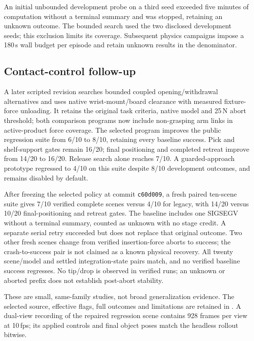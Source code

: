 An initial unbounded development probe on a third seed exceeded five minutes
of computation without a terminal summary and was stopped, retaining an
unknown outcome. The bounded search used the two disclosed development seeds;
this exclusion limits its coverage. Subsequent physics campaigns impose a
180\,s wall budget per episode and retain unknown results in the denominator.

\subsection{Contact-control follow-up}
A later scripted revision searches bounded coupled opening/withdrawal alternatives
and uses native wrist-mount/board clearance with measured fixture-force unloading.
It retains the original task criteria, native model and 25\,N abort threshold;
both comparison programs now include non-grasping arm links in active-product
force coverage. The selected program improves the public regression suite from
6/10 to 8/10, retaining every baseline success. Pick and shelf-support gates remain
16/20; final positioning and completed retreat improve from 14/20 to 16/20.
Release search alone reaches 7/10. A guarded-approach prototype regressed to 4/10
on this suite despite 8/10 development outcomes, and remains disabled by default.

After freezing the selected policy at commit \texttt{c60d009}, a fresh paired
ten-scene suite gives 7/10 verified complete scenes versus 4/10 for legacy, with
14/20 versus 10/20 final-positioning and retreat gates. The baseline includes one
SIGSEGV without a terminal summary, counted as unknown with no stage credit.
A separate serial retry succeeded but does not replace that original outcome.
Two other fresh scenes change from verified insertion-force aborts to success;
the crash-to-success pair is not claimed as a known physical recovery.
All twenty scene/model and settled integration-state pairs match, and no verified
baseline success regresses. No tip/drop is observed in verified runs; an unknown
or aborted prefix does not establish post-abort stability.

These are small, same-family studies, not broad generalization evidence. The
selected source, effective flags, full outcomes and limitations are retained in
. A dual-view recording of the
repaired regression scene contains 928 frames per view at 10\,fps; its applied
controls and final object poses match the headless rollout bitwise.

